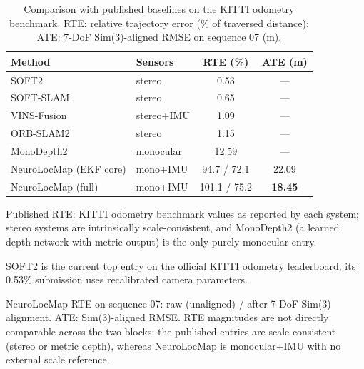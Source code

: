 \begin{table}[!t]
    \centering
    \setlength{\tabcolsep}{4pt}
    \footnotesize
    \caption{Comparison with published baselines on the KITTI odometry benchmark. RTE: relative trajectory error (\% of traversed distance); ATE: 7-DoF Sim(3)-aligned RMSE on sequence 07 (m).}
    \label{tab:external}
    \begin{threeparttable}
        \begin{tabular}{@{}l l c c@{}}
            \toprule
            Method & Sensors & RTE (\%) & ATE (m) \\
            \midrule
            SOFT2~\cite{cvisic2023soft2}      & stereo     & 0.53  & --- \\
            SOFT-SLAM~\cite{Cvisic2017}       & stereo     & 0.65  & --- \\
            VINS-Fusion~\cite{VinsFusion2018} & stereo+IMU & 1.09  & --- \\
            ORB-SLAM2~\cite{MurArtal2017}     & stereo     & 1.15  & --- \\
            MonoDepth2~\cite{Godard2021}      & monocular  & 12.59 & --- \\
            \midrule
            NeuroLocMap (EKF core)  & mono+IMU & 94.7 / 72.1  & 22.09 \\
            NeuroLocMap (full)      & mono+IMU & 101.1 / 75.2 & \textbf{18.45} \\
            \bottomrule
        \end{tabular}
        \begin{tablenotes}
            \scriptsize
            \item Published RTE: KITTI odometry benchmark values as reported by each system; stereo systems are intrinsically scale-consistent, and MonoDepth2 (a learned depth network with metric output) is the only purely monocular entry.
            \item SOFT2 is the current top entry on the official KITTI odometry leaderboard; its 0.53\% submission uses recalibrated camera parameters.
            \item NeuroLocMap RTE on sequence 07: raw (unaligned) / after 7-DoF Sim(3) alignment. ATE: Sim(3)-aligned RMSE. RTE magnitudes are not directly comparable across the two blocks: the published entries are scale-consistent (stereo or metric depth), whereas NeuroLocMap is monocular+IMU with no external scale reference.
        \end{tablenotes}
    \end{threeparttable}
\end{table}

